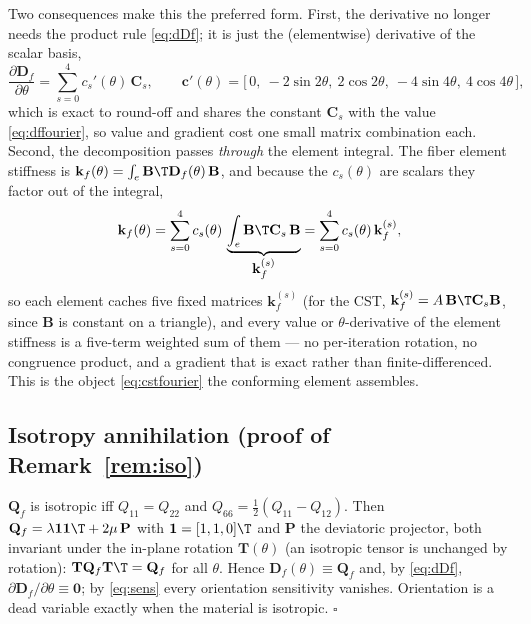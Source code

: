 \documentclass[11pt]{article}
\begin{document}
Two consequences make this the preferred form. First, the derivative no longer needs
the product rule \eqref{eq:dDf}; it is just the (elementwise) derivative of the
scalar basis,
\begin{equation}
  \frac{\partial\mathbf D_f}{\partial\theta}=\sum_{s=0}^{4}c_s'(\theta)\,\mathbf C_s,
  \qquad
  \mathbf c'(\theta)=\bigl[\,0,\ -2\sin2\theta,\ 2\cos2\theta,\ -4\sin4\theta,\ 4\cos4\theta\,\bigr],
  \label{eq:dffourierderiv}
\end{equation}
which is exact to round-off and shares the constant $\mathbf C_s$ with the value
\eqref{eq:dffourier}, so value and gradient cost one small matrix combination each.
Second, the decomposition passes \emph{through} the element integral. The fiber
element stiffness is $\mathbf k_f(\theta)=\int_e \mathbf B\T\mathbf D_f(\theta)\,
\mathbf B$, and because the $c_s(\theta)$ are scalars they factor out of the integral,
\begin{equation}
  \mathbf k_f(\theta)=\sum_{s=0}^{4}c_s(\theta)\,\underbrace{\int_e \mathbf B\T
    \mathbf C_s\,\mathbf B}_{\textstyle \mathbf k_f^{(s)}}
  =\sum_{s=0}^{4}c_s(\theta)\,\mathbf k_f^{(s)} ,
  \label{eq:kffourier}
\end{equation}
so each element caches five fixed matrices $\mathbf k_f^{(s)}$ (for the CST,
$\mathbf k_f^{(s)}=A\,\mathbf B\T\mathbf C_s\mathbf B$, since $\mathbf B$ is
constant on a triangle), and every value or $\theta$-derivative of the element
stiffness is a five-term weighted sum of them --- no per-iteration rotation, no
congruence product, and a gradient that is exact rather than finite-differenced. This
is the object \eqref{eq:cstfourier} the conforming element assembles.

\subsection{Isotropy annihilation (proof of Remark~\ref{rem:iso})}
$\mathbf Q_f$ is isotropic iff $Q_{11}=Q_{22}$ and $Q_{66}=\tfrac12(Q_{11}-Q_{12})$.
Then $\mathbf Q_f=\lambda\mathbf 1\mathbf 1\T+2\mu\,\mathbf P$ with $\mathbf
1=[1,1,0]\T$ and $\mathbf P$ the deviatoric projector, both invariant under the
in-plane rotation $\mathbf T(\theta)$ (an isotropic tensor is unchanged by
rotation): $\mathbf T\mathbf Q_f\mathbf T\T=\mathbf Q_f$ for all $\theta$. Hence
$\mathbf D_f(\theta)\equiv\mathbf Q_f$ and, by \eqref{eq:dDf},
$\partial\mathbf D_f/\partial\theta\equiv\mathbf 0$; by \eqref{eq:sens} every
orientation sensitivity vanishes. Orientation is a dead variable exactly when the
material is isotropic. $\square$
\end{document}
